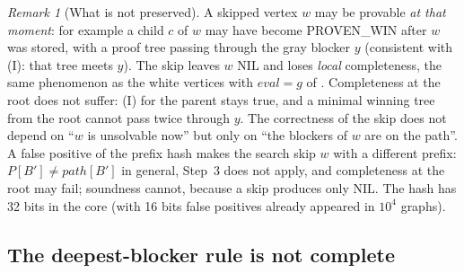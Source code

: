 \documentclass{article}
\theoremstyle{plain}
\theoremstyle{definition}
\theoremstyle{remark}
\newtheorem{remark}[theorem]{Remark}
\newcommand{\eval}{\mathit{eval}}
\newcommand{\NIL}{\ensuremath{\mathrm{NIL}}}
\newcommand{\PW}{\textsf{PROVEN\_WIN}}
\begin{document}
\begin{remark}[What is not preserved]
A skipped vertex $w$ may be provable \emph{at that moment}: for example a child $c$ of $w$ may have become \PW{} after $w$ was stored, with a proof tree passing through the gray blocker $y$ (consistent with (I): that tree meets $y$). The skip leaves $w$ \NIL{} and loses \emph{local} completeness, the same phenomenon as the white vertices with $\eval = g$ of \cite{romano2026}. Completeness at the root does not suffer: (I) for the parent stays true, and a minimal winning tree from the root cannot pass twice through $y$. The correctness of the skip does not depend on ``$w$ is unsolvable now'' but only on ``the blockers of $w$ are on the path''. A false positive of the prefix hash makes the search skip $w$ with a different prefix: $P[B'] \neq \mathit{path}[B']$ in general, Step~3 does not apply, and completeness at the root may fail; soundness cannot, because a skip produces only \NIL{}. The hash has 32 bits in the core (with 16 bits false positives already appeared in $10^4$ graphs).
\end{remark}

\subsection{The deepest-blocker rule is not complete}\label{sec:p4}
\end{document}
